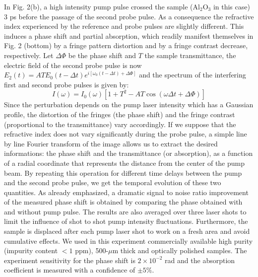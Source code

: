 \documentclass[aps,prb,reprint]{revtex4-2}
\begin{document}
In Fig. 2(b), a high intensity pump pulse crossed the sample (Al$_2$O$_3$ in this case) 3 ps before the passage of the second probe pulse. As a consequence the refractive index experienced by the reference and probe pulses are slightly different. This induces a phase shift and partial absorption, which readily manifest themselves in Fig. 2 (bottom) by a fringe pattern distortion and by a fringe contrast decrease, respectively. Let $\Delta \Phi$ be the phase shift and $T$ the sample transmittance, the electric field of the second probe pulse is now $E_2(t) = A T E_0(t-\Delta t) e^{i [\omega_0(t-\Delta t) + \Delta \Phi]}$ and the spectrum of the interfering first and second probe pulses is given by:
\begin{equation}
I(\omega) = I_0(\omega) \left[ 1 + T^2 - A T \cos(\omega \Delta t + \Delta \Phi) \right]
\end{equation}
Since the perturbation depends on the pump laser intensity which has a Gaussian profile, the distortion of the fringes (the phase shift) and the fringe contrast (proportional to the transmittance) vary accordingly. If we suppose that the refractive index does not vary significantly during the probe pulse, a simple line by line Fourier transform of the image allows us to extract the desired informations: the phase shift and the transmittance (or absorption), as a function of a radial coordinate that represents the distance from the center of the pump beam. By repeating this operation for different time delays between the pump and the second probe pulse, we get the temporal evolution of these two quantities. As already emphasized, a dramatic signal to noise ratio improvement of the measured phase shift is obtained by comparing the phase obtained with and without pump pulse. The results are also averaged over three laser shots to limit the influence of shot to shot pump intensity fluctuations. Furthermore, the sample is displaced after each pump laser shot to work on a fresh area and avoid cumulative effects. We used in this experiment commercially available high purity (impurity content $< 1$ ppm), 500-$\mu$m thick and optically polished samples. The experiment sensitivity for the phase shift is $2\times10^{-2}$ rad and the absorption coefficient is measured with a confidence of $\pm 5\%$.
\end{document}
